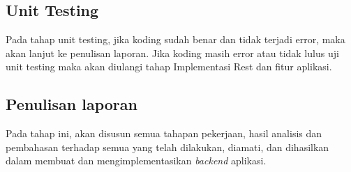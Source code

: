 \subsection{Unit Testing}
Pada tahap unit testing, jika koding sudah benar dan tidak terjadi error, maka akan lanjut ke penulisan laporan. Jika koding masih error atau tidak lulus uji unit testing maka akan diulangi tahap Implementasi Rest dan fitur aplikasi.

\subsection{Penulisan laporan}
Pada tahap ini, akan disusun semua tahapan pekerjaan, hasil analisis dan pembahasan terhadap semua yang telah dilakukan, diamati, dan dihasilkan dalam membuat dan mengimplementasikan \textit{backend} aplikasi.

